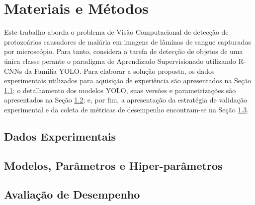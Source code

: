 \chapter{Materiais e Métodos} \label{cap:metodologia}

Este trabalho aborda o problema de Visão Computacional de detecção de protozoários causadores de malária em imagens de lâminas de sangue capturadas por microscópio. Para tanto, considera a tarefa de detecção de objetos de uma única classe perante o paradigma de Aprendizado Supervisionado utilizando R-CNNs da Família YOLO. Para elaborar a solução proposta, os dados experimentais utilizados para aquisição de experiência são apresentados na Seção \ref{sec:metodologia:dados}; o detalhamento dos modelos YOLO, suas versões e parametrizações são apresentados na Seção \ref{sec:metodologia:modelos}; e, por fim, a apresentação da estratégia de validação experimental e da coleta de métricas de desempenho encontram-se na Seção \ref{sec:metodologia:desempenho}.

\section{Dados Experimentais} \label{sec:metodologia:dados}


\section{Modelos, Parâmetros e Hiper-parâmetros}\label{sec:metodologia:modelos}



\section{Avaliação de Desempenho}
\label{sec:metodologia:desempenho}

